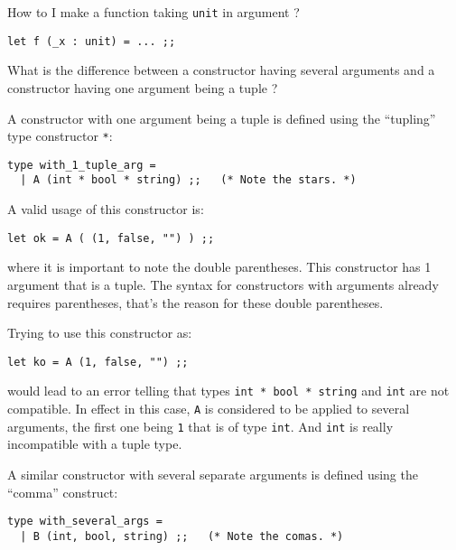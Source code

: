 \documentclass[10pt,a4paper]{article}
\begin{document}
\bigskip
\begin{faqitem}
How to I make a function taking {\tt unit} in argument ?

\medskip
{}
\lstinline"let f (_x : unit) = ... ;;"
\end{faqitem}



\bigskip
\begin{faqitem}
What is the difference between a constructor having several
arguments and a constructor having one argument being a tuple ?

\medskip
{}
A constructor with one argument being a tuple is defined using the ``tupling''
type constructor \lstinline{*}:
{\small
\begin{lstlisting}
type with_1_tuple_arg =
  | A (int * bool * string) ;;   (* Note the stars. *)
\end{lstlisting}}

A valid usage of this constructor is:
{\small
\begin{lstlisting}
let ok = A ( (1, false, "") ) ;;
\end{lstlisting}}

\noindent where it is important to note the double parentheses. This
constructor has 1 argument that is a tuple. The syntax for constructors with
arguments already requires parentheses, that's the reason for these double
parentheses.

Trying to use this constructor as:

{\small
\begin{lstlisting}
let ko = A (1, false, "") ;;
\end{lstlisting}}

\noindent would lead to an error telling that types {\tt int * bool * string}
and {\tt int} are not compatible. In effect in this case, {\tt A} is
considered to be applied to several arguments, the first one being {\tt 1}
that is of type {\tt int}. And {\tt int} is really incompatible with a tuple
type.

A similar constructor with several separate arguments is defined using
the ``comma'' construct:

{\small
\begin{lstlisting}
type with_several_args =
  | B (int, bool, string) ;;   (* Note the comas. *)
\end{lstlisting}}


\end{faqitem}
\end{document}
